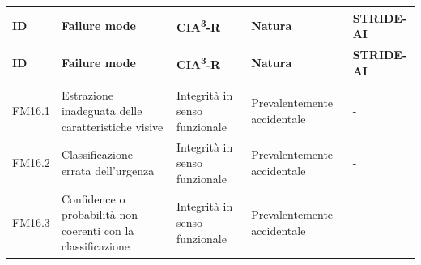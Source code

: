 {
\small
{}
\setlength{\tabcolsep}{4pt}
\renewcommand{\arraystretch}{1.08}

\begin{xltabular}{\textwidth}{
    >{\raggedright\arraybackslash}p{1.35cm}
    X
    >{\raggedright\arraybackslash}p{3.5cm}
    >{\raggedright\arraybackslash}p{2.7cm}
    >{\raggedright\arraybackslash}p{2.4cm}
}

\toprule

\textbf{ID} &
\textbf{Failure mode} &
\textbf{CIA\textsuperscript{3}-R} &
\textbf{Natura} &
\textbf{STRIDE-AI} \\

\midrule

\endfirsthead

\toprule

\textbf{ID} &
\textbf{Failure mode} &
\textbf{CIA\textsuperscript{3}-R} &
\textbf{Natura} &
\textbf{STRIDE-AI} \\

\midrule

\endhead

 \\
\endfoot

\endlastfoot


FM16.1 &

Estrazione inadeguata delle caratteristiche visive &

Integrità in senso funzionale &

Prevalentemente accidentale &

- \\

\midrule


FM16.2 &

Classificazione errata dell'urgenza &

Integrità in senso funzionale &

Prevalentemente accidentale &

- \\

\midrule


FM16.3 &

Confidence o probabilità non coerenti con la classificazione &

Integrità in senso funzionale &

Prevalentemente accidentale &

- \\

\midrule



\end{xltabular}}
